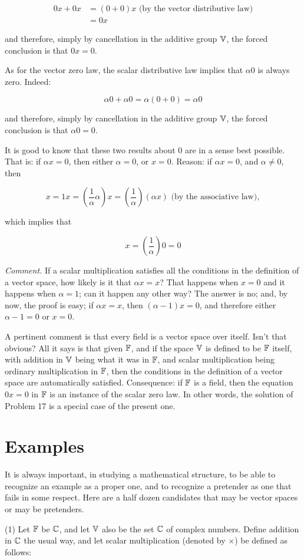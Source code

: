 \begin{align}
    0x + 0x & = (0+0)x \text{ (by the vector distributive law)} \\
            & = 0x
\end{align}

and therefore, simply by cancellation in the additive group $\mathbb{V}$, the forced conclusion is that $0x=0$.

As for the vector zero law, the scalar distributive law implies that $\alpha 0$ is always zero. Indeed:

\begin{equation}
    \alpha 0 + \alpha 0 = \alpha(0+0) = \alpha 0
\end{equation}

and therefore, simply by cancellation in the additive group $\mathbb{V}$, the forced conclusion is that $\alpha 0 = 0$.

It is good to know that these two results about 0 are in a sense best possible. That is: if $\alpha x = 0$, then either $\alpha = 0$, or $x = 0$. Reason: if $\alpha x = 0$, and $\alpha \neq 0$, then

\begin{equation}
    x = 1x = (\frac{1}{\alpha} \alpha)x = (\frac{1}{\alpha}) (\alpha x) \text{ (by the associative law)},
\end{equation}

which implies that

\begin{equation}
    x = (\frac{1}{\alpha}) 0 = 0
\end{equation}

\textit{Comment.} If a scalar multiplication satisfies all the conditions in the definition of a vector space, how likely is it that $\alpha x = x$? That happens when $x = 0$ and it happens when $\alpha = 1$; can it happen any other way? The answer is no; and, by now, the proof is easy; if $\alpha x = x$, then $(\alpha - 1)x = 0$, and therefore either $\alpha - 1 = 0$ or $x = 0$.

A pertinent comment is that every field is a vector space over itself. Isn't that obvious? All it says is that given $\mathbb{F}$, and if the space $\mathbb{V}$ is defined to be $\mathbb{F}$ itself, with addition in $\mathbb{V}$ being what it was in $\mathbb{F}$, and scalar multiplication being ordinary multiplication in $\mathbb{F}$, then the conditions in the definition of a vector space are automatically satisfied. Consequence: if $\mathbb{F}$ is a field, then the equation $0x=0$ in $\mathbb{F}$ is an instance of the scalar zero law. In other words, the solution of Problem 17 is a special case of the present one.

\section{Examples}

It is always important, in studying a mathematical structure, to be able to recognize an example as a proper one, and to recognize a pretender as one that fails in some respect. Here are a half dozen candidates that may be vector spaces or may be pretenders.

(1) Let $\mathbb{F}$ be $\mathbb{C}$, and let $\mathbb{V}$ also be the set $\mathbb{C}$ of complex numbers. Define addition in $\mathbb{C}$ the usual way, and let scalar multiplication (denoted by $\times$) be defined as follows:
